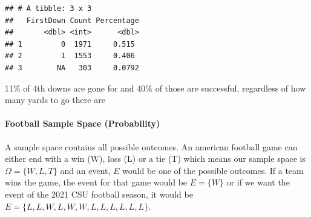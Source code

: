 \documentclass[]{article}
\let\oldparagraph\paragraph
\renewcommand{\paragraph}[1]{\oldparagraph{#1}\mbox{}}
\begin{document}
\begin{verbatim}
## # A tibble: 3 x 3
##   FirstDown Count Percentage
##       <dbl> <int>      <dbl>
## 1         0  1971     0.515 
## 2         1  1553     0.406 
## 3        NA   303     0.0792
\end{verbatim}

11\% of 4th downs are gone for and 40\% of those are successful,
regardless of how many yards to go there are

\hypertarget{football-sample-space-probability}{%
\paragraph{Football Sample Space
(Probability)}\label{football-sample-space-probability}}

A sample space contains all possible outcomes. An american football game
can either end with a win (W), loss (L) or a tie (T) which means our
sample space is \(\Omega = \{W,L,T \}\) and an event, \(E\) would be one
of the possible outcomes. If a team wins the game, the event for that
game would be \(E=\{W \}\) or if we want the event of the 2021 CSU
football season, it would be
\(E=\{ L, L, W, L, W, W, L, L, L, L, L, L \}\).
\end{document}
